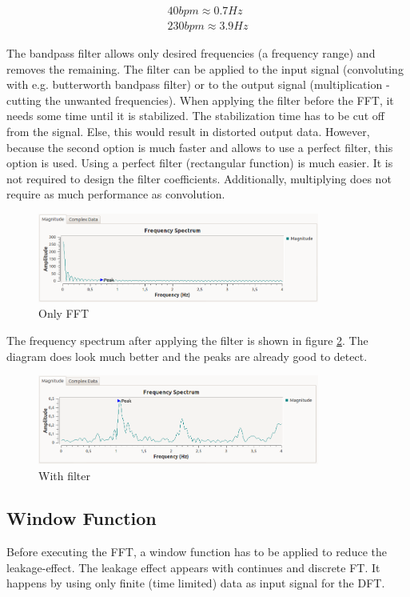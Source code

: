 \documentclass[notitlepage]{scrreprt}
\begin{document}
\begin{equation}
\begin{aligned}
40bpm \approx 0.7Hz\\
230bpm \approx 3.9Hz
\end{aligned}
\end{equation}

The bandpass filter allows only desired frequencies (a frequency range) and removes the remaining. The filter can be applied to the input signal (convoluting with e.g. butterworth bandpass filter) or to the output signal (multiplication - cutting the unwanted frequencies). When applying the filter before the FFT, it needs some time until it is stabilized. The stabilization time has to be cut off from the signal. Else, this would result in distorted output data. However, because the second option is much faster and allows to use a perfect filter, this option is used. Using a perfect filter (rectangular function) is much easier. It is not required to design the filter coefficients. Additionally, multiplying does not require as much performance as convolution.

\begin{figure}[H]
	\centering
	\includegraphics[width=350px]{images/OnlyFFTNoFilterAndWindow.png}
	\caption{Only FFT}
	\label{fig:only-fft}
\end{figure}

The frequency spectrum after applying the filter is shown in figure \ref{fig:filter}. The diagram does look much better and the peaks are already good to detect.

\begin{figure}[H]
	\centering
	\includegraphics[width=350px]{images/withFilterNoWindow.png}
	\caption{With filter}
	\label{fig:filter}
\end{figure}

\subsection{Window Function}
Before executing the FFT, a window function has to be applied to reduce the leakage-effect. The leakage effect appears with continues and discrete FT. It happens by using only finite (time limited) data as input signal for the DFT.
\end{document}
